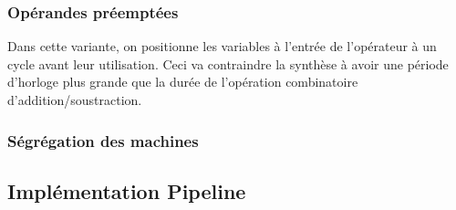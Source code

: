 \documentclass[12pt,a4paper]{article}
\begin{document}
\subsubsection{Opérandes préemptées}
Dans cette variante, on positionne les variables à l'entrée de l'opérateur à un cycle avant leur utilisation. Ceci va contraindre la synthèse à avoir une période d'horloge plus grande que la durée de l'opération combinatoire d'addition/soustraction.

\subsubsection{Ségrégation des machines} %

\subsection{Implémentation Pipeline} %
\end{document}
